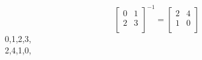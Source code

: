 $$
{
\left[
\begin{array}{*{2}{r}}
0 & 1\\
2 & 3\\
\end{array}
\right]
}^{-1}
=
\left[
\begin{array}{*{2}{r}}
2 & 4\\
1 & 0\\
\end{array}
\right]
$$
0,1,2,3,\\
2,4,1,0,\\
